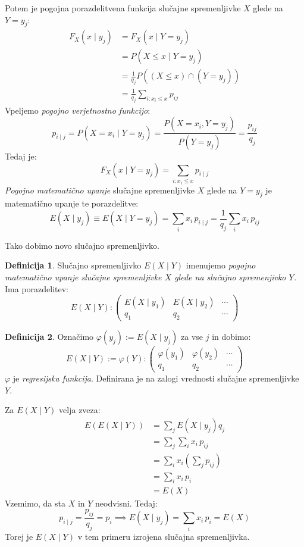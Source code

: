 \documentclass[12pt]{book}
\def\n{\noindent}
\theoremstyle{definition}
\newtheorem{definicija}{Definicija}
\theoremstyle{plain}
\theoremstyle{plain}
\theoremstyle{plain}
\theoremstyle{remark}
\begin{document}
\n Potem je pogojna porazdelitvena funkcija slučajne spremenljivke $X$ glede na $Y=y_j$: 
$$
\begin{aligned}
    F_X\left(x \mid y_j\right)&=F_X\left(x \mid Y=y_j\right) \\
    &=P\left(X \leq x \mid Y=y_j \right) \\
    &=\frac{1}{q_j} P\left((X \leq x) \cap\left(Y = y_j\right)\right) \\
    &=\frac{1}{q_j} \sum_{i : x_i \leq x} p_{i j}
\end{aligned}
$$
Vpeljemo \emph{pogojno verjetnostno funkcijo}:
$$
p_{i \mid j}=P\left(X=x_i \mid Y=y_j\right)=\frac{P\left(X=x_i, Y=y_j\right)}{P\left(Y=y_j\right)}=\frac{p_{i j}}{q_j}
$$
Tedaj je:
$$
F_X\left(x \mid Y=y_j\right)=\sum_{i: x_i \leq x} p_{i \mid j}
$$
\emph{Pogojno matematično upanje} slučajne spremenljivke $X$ glede na $Y=y_j$ je matematično upanje te porazdelitve: 
$$
E\left(X \mid y_j\right) \equiv E\left(X \mid Y=y_j\right)=\sum_i x_i \, p_{i \mid j}=\frac{1}{q_j} \sum_i x_i \, p_{i j}
$$

\n Tako dobimo novo slučajno spremenljivko.

\begin{definicija}
    Slučajno spremenljivko $E(X \mid Y)$ imenujemo \emph{pogojno matematično upanje slučajne spremenljivke $X$ glede na slučajno spremenjivko $Y$.} Ima porazdelitev:
    $$
    E(X \mid Y):\left(\begin{array}{ccc}
        E\left(X \mid y_1\right) & E\left(X \mid y_2\right) & \cdots \\
        q_1 & q_2 & \cdots
        \end{array}\right)
    $$
\end{definicija}

\begin{definicija}
    Označimo $\varphi\left(y_j\right):=E\left(X \mid y_j\right)$ za vse $j$ in dobimo: 
    $$
    E(X \mid Y):=\varphi(Y):\left(\begin{array}{ccc}
        \varphi\left(y_1\right) & \varphi\left(y_2\right) & \cdots \\
        q_1 & q_2 & \cdots 
        \end{array}\right)
    $$
    $\varphi$ je \emph{regresijska funkcija}. Definirana je na zalogi vrednosti slučajne spremenljivke $Y$. 
\end{definicija}

\n Za $E(X \mid Y)$ velja zveza: 
$$
\begin{aligned}
    E(E(X \mid Y))&=\sum_j E\left(X \mid y_j\right) q_j \\
    &=\sum_j \sum_i x_i \, p_{i j} \\
    &=\sum_i x_i\left(\sum_j p_{i j}\right) \\
    &=\sum_i x_i \, p_i \\
    &=E(X)
\end{aligned}
$$
Vzemimo, da sta $X$ in $Y$ neodvisni. Tedaj: 
$$
p_{i \mid j}=\frac{p_{i j}}{q_j}=p_i \implies E\left(X \mid y_j\right)=\sum_i x_i\, p_i=E(X)
$$
Torej je $E(X \mid Y)$ v tem primeru izrojena slučajna spremenljivka.
\end{document}
